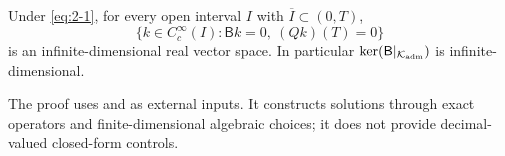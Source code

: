 \begin{theorem}\label{thm:kernel}
Under \eqref{eq:2-1}, for every open interval \(I\) with \(\overline I\subset(0,T)\),
\begin{equation}\label{eq:2-6}
\{k\in C_c^\infty(I):\mathsf Bk=0,\ (Qk)(T)=0\}
\end{equation}
is an infinite-dimensional real vector space. In particular \(\ker(\mathsf B|_{\mathcal K_{\rm adm}})\) is infinite-dimensional.

\end{theorem}

The proof uses \cite[Theorem~2.1]{Cannarsa2020} and \cite[Theorem~29]{Almira2007} as external inputs. It constructs solutions through exact operators and finite-dimensional algebraic choices; it does not provide decimal-valued closed-form controls.
